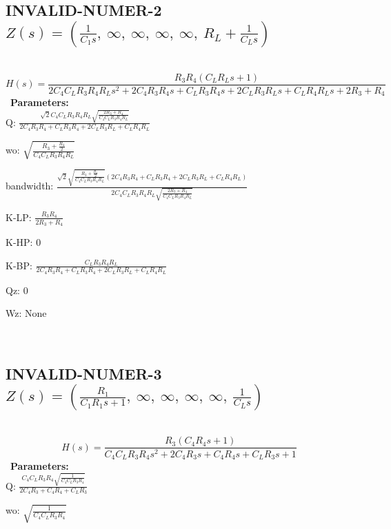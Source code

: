 \documentclass{article}
\begin{document}
\subsection{INVALID-NUMER-2 $Z(s) = \left( \frac{1}{C_{1} s}, \  \infty, \  \infty, \  \infty, \  \infty, \  R_{L} + \frac{1}{C_{L} s}\right)$ } \ 
\textbf{\[H(s) = \frac{R_{3} R_{4} \left(C_{L} R_{L} s + 1\right)}{2 C_{4} C_{L} R_{3} R_{4} R_{L} s^{2} + 2 C_{4} R_{3} R_{4} s + C_{L} R_{3} R_{4} s + 2 C_{L} R_{3} R_{L} s + C_{L} R_{4} R_{L} s + 2 R_{3} + R_{4}}\] } \ 
\textbf{Parameters:}\\ 

Q: $\frac{\sqrt{2} C_{4} C_{L} R_{3} R_{4} R_{L} \sqrt{\frac{2 R_{3} + R_{4}}{C_{4} C_{L} R_{3} R_{4} R_{L}}}}{2 C_{4} R_{3} R_{4} + C_{L} R_{3} R_{4} + 2 C_{L} R_{3} R_{L} + C_{L} R_{4} R_{L}}$\ 

wo: $\sqrt{\frac{R_{3} + \frac{R_{4}}{2}}{C_{4} C_{L} R_{3} R_{4} R_{L}}}$\ 

bandwidth: $\frac{\sqrt{2} \sqrt{\frac{R_{3} + \frac{R_{4}}{2}}{C_{4} C_{L} R_{3} R_{4} R_{L}}} \left(2 C_{4} R_{3} R_{4} + C_{L} R_{3} R_{4} + 2 C_{L} R_{3} R_{L} + C_{L} R_{4} R_{L}\right)}{2 C_{4} C_{L} R_{3} R_{4} R_{L} \sqrt{\frac{2 R_{3} + R_{4}}{C_{4} C_{L} R_{3} R_{4} R_{L}}}}$\ 

K-LP: $\frac{R_{3} R_{4}}{2 R_{3} + R_{4}}$\ 

K-HP: $0$\ 

K-BP: $\frac{C_{L} R_{3} R_{4} R_{L}}{2 C_{4} R_{3} R_{4} + C_{L} R_{3} R_{4} + 2 C_{L} R_{3} R_{L} + C_{L} R_{4} R_{L}}$\ 

Qz: $0$\ 

Wz: $\text{None}$\ 

\ 

\subsection{INVALID-NUMER-3 $Z(s) = \left( \frac{R_{1}}{C_{1} R_{1} s + 1}, \  \infty, \  \infty, \  \infty, \  \infty, \  \frac{1}{C_{L} s}\right)$ } \ 
\textbf{\[H(s) = \frac{R_{3} \left(C_{4} R_{4} s + 1\right)}{C_{4} C_{L} R_{3} R_{4} s^{2} + 2 C_{4} R_{3} s + C_{4} R_{4} s + C_{L} R_{3} s + 1}\] } \ 
\textbf{Parameters:}\\ 

Q: $\frac{C_{4} C_{L} R_{3} R_{4} \sqrt{\frac{1}{C_{4} C_{L} R_{3} R_{4}}}}{2 C_{4} R_{3} + C_{4} R_{4} + C_{L} R_{3}}$\ 

wo: $\sqrt{\frac{1}{C_{4} C_{L} R_{3} R_{4}}}$\ 
\end{document}
